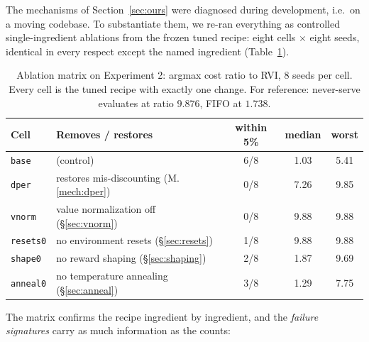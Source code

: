 \documentclass[11pt,a4paper]{article}
\begin{document}
The mechanisms of Section~\ref{sec:ours} were diagnosed during
development, i.e.\ on a moving codebase.  To substantiate them, we
re-ran everything as controlled single-ingredient ablations from the
frozen tuned recipe: eight cells $\times$ eight seeds, identical in
every respect except the named ingredient
(Table~\ref{tab:ablation}).

\begin{table}[h]
\centering
\caption{Ablation matrix on Experiment 2: argmax cost ratio to RVI,
8 seeds per cell.  Every cell is the tuned recipe with exactly one
change.  For reference: never-serve evaluates at ratio $9.876$, FIFO at
$1.738$.}
\label{tab:ablation}
\begin{tabular}{llccc}
\toprule
Cell & Removes / restores & within 5\% & median & worst \\
\midrule
\texttt{base} & (control) & 6/8 & 1.03 & 5.41 \\
\texttt{dper} & restores mis-discounting (M.\ref{mech:dper}) & 0/8 & 7.26 & 9.85 \\
\texttt{vnorm} & value normalization off (\S\ref{sec:vnorm}) & 0/8 & 9.88 & 9.88 \\
\texttt{resets0} & no environment resets (\S\ref{sec:resets}) & 1/8 & 9.88 & 9.88 \\
\texttt{shape0} & no reward shaping (\S\ref{sec:shaping}) & 2/8 & 1.87 & 9.69 \\
\texttt{anneal0} & no temperature annealing (\S\ref{sec:anneal}) & 3/8 & 1.29 & 7.75 \\
\bottomrule
\end{tabular}
\end{table}

The matrix confirms the recipe ingredient by ingredient, and the
\emph{failure signatures} carry as much information as the counts:
\end{document}
